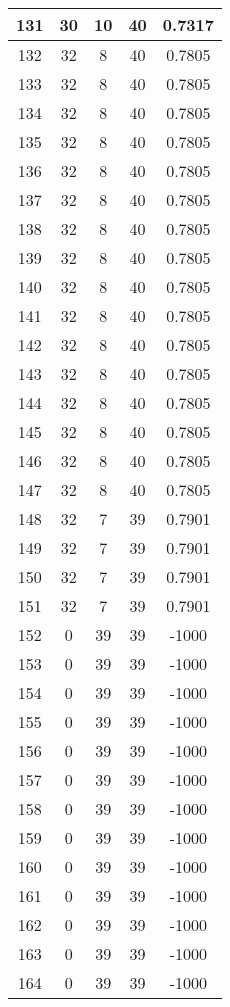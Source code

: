 \documentclass[letterpaper, 12pt]{article}
\begin{document}
\begin{longtable}{|c|c|c|c|c|}
\hline
131 & 30 & 10 & 40 & 0.7317 \\
\hline
132 & 32 & 8 & 40 & 0.7805 \\
\hline
133 & 32 & 8 & 40 & 0.7805 \\
\hline
134 & 32 & 8 & 40 & 0.7805 \\
\hline
135 & 32 & 8 & 40 & 0.7805 \\
\hline
136 & 32 & 8 & 40 & 0.7805 \\
\hline
137 & 32 & 8 & 40 & 0.7805 \\
\hline
138 & 32 & 8 & 40 & 0.7805 \\
\hline
139 & 32 & 8 & 40 & 0.7805 \\
\hline
140 & 32 & 8 & 40 & 0.7805 \\
\hline
141 & 32 & 8 & 40 & 0.7805 \\
\hline
142 & 32 & 8 & 40 & 0.7805 \\
\hline
143 & 32 & 8 & 40 & 0.7805 \\
\hline
144 & 32 & 8 & 40 & 0.7805 \\
\hline
145 & 32 & 8 & 40 & 0.7805 \\
\hline
146 & 32 & 8 & 40 & 0.7805 \\
\hline
147 & 32 & 8 & 40 & 0.7805 \\
\hline
148 & 32 & 7 & 39 & 0.7901 \\
\hline
149 & 32 & 7 & 39 & 0.7901 \\
\hline
150 & 32 & 7 & 39 & 0.7901 \\
\hline
151 & 32 & 7 & 39 & 0.7901 \\
\hline
152 & 0 & 39 & 39 & -1000 \\
\hline
153 & 0 & 39 & 39 & -1000 \\
\hline
154 & 0 & 39 & 39 & -1000 \\
\hline
155 & 0 & 39 & 39 & -1000 \\
\hline
156 & 0 & 39 & 39 & -1000 \\
\hline
157 & 0 & 39 & 39 & -1000 \\
\hline
158 & 0 & 39 & 39 & -1000 \\
\hline
159 & 0 & 39 & 39 & -1000 \\
\hline
160 & 0 & 39 & 39 & -1000 \\
\hline
161 & 0 & 39 & 39 & -1000 \\
\hline
162 & 0 & 39 & 39 & -1000 \\
\hline
163 & 0 & 39 & 39 & -1000 \\
\hline
164 & 0 & 39 & 39 & -1000 \\

\end{longtable}
\end{document}
